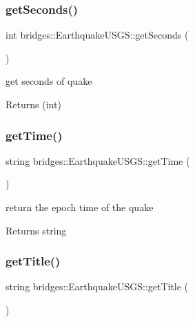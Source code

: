 \subsubsection{\texorpdfstring{get\+Seconds()}{getSeconds()}}
{\footnotesize\ttfamily int bridges\+::\+Earthquake\+U\+S\+G\+S\+::get\+Seconds (\begin{DoxyParamCaption}{ }\end{DoxyParamCaption})\hspace{0.3cm}{\ttfamily [inline]}}

get seconds of quake

\begin{DoxyReturn}{Returns}
(int) 
\end{DoxyReturn}
\mbox{\label{classbridges_1_1_earthquake_u_s_g_s_a8d142b4ea194c5d839015ee7850a12c6}} 
\subsubsection{\texorpdfstring{get\+Time()}{getTime()}}
{\footnotesize\ttfamily string bridges\+::\+Earthquake\+U\+S\+G\+S\+::get\+Time (\begin{DoxyParamCaption}{ }\end{DoxyParamCaption})\hspace{0.3cm}{\ttfamily [inline]}}

return the epoch time of the quake

\begin{DoxyReturn}{Returns}
string 
\end{DoxyReturn}
\mbox{\label{classbridges_1_1_earthquake_u_s_g_s_a6b8e10f1a092c8884428cecbd1defb19}} 
\subsubsection{\texorpdfstring{get\+Title()}{getTitle()}}
{\footnotesize\ttfamily string bridges\+::\+Earthquake\+U\+S\+G\+S\+::get\+Title (\begin{DoxyParamCaption}{ }\end{DoxyParamCaption})\hspace{0.3cm}{\ttfamily [inline]}}

